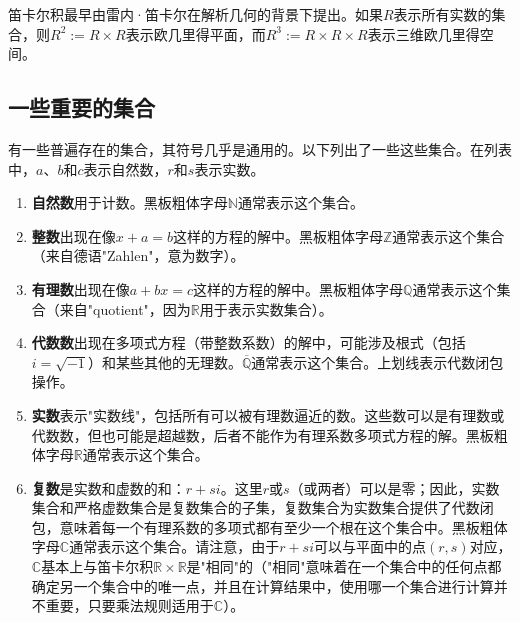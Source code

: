 笛卡尔积最早由雷内·笛卡尔在解析几何的背景下提出。如果$R$表示所有实数的集合，则$R^2 := R \times R$表示欧几里得平面，而$R^3 := R \times R \times R$表示三维欧几里得空间。
\subsection{一些重要的集合}  
有一些普遍存在的集合，其符号几乎是通用的。以下列出了一些这些集合。在列表中，$a$、$b$和$c$表示自然数，$r$和$s$表示实数。
\begin{enumerate}
\item \textbf{自然数}用于计数。黑板粗体字母$ \mathbb{N} $通常表示这个集合。
\item \textbf{整数}出现在像$x + a = b$这样的方程的解中。黑板粗体字母$ \mathbb{Z} $通常表示这个集合（来自德语"Zahlen"，意为数字）。
\item \textbf{有理数}出现在像$a + bx = c$这样的方程的解中。黑板粗体字母$ \mathbb{Q} $通常表示这个集合（来自"quotient"，因为$ \mathbb{R} $用于表示实数集合）。
\item \textbf{代数数}出现在多项式方程（带整数系数）的解中，可能涉及根式（包括$i = \sqrt{-1}$）和某些其他的无理数。$ \overline{\mathbb{Q}} $通常表示这个集合。上划线表示代数闭包操作。
\item \textbf{实数}表示"实数线"，包括所有可以被有理数逼近的数。这些数可以是有理数或代数数，但也可能是超越数，后者不能作为有理系数多项式方程的解。黑板粗体字母$ \mathbb{R} $通常表示这个集合。
\item \textbf{复数}是实数和虚数的和：$r + si$。这里$r$或$s$（或两者）可以是零；因此，实数集合和严格虚数集合是复数集合的子集，复数集合为实数集合提供了代数闭包，意味着每一个有理系数的多项式都有至少一个根在这个集合中。黑板粗体字母$ \mathbb{C} $通常表示这个集合。请注意，由于$ r + si $可以与平面中的点$(r, s)$对应，$ \mathbb{C} $基本上与笛卡尔积$ \mathbb{R} \times \mathbb{R} $是"相同"的（"相同"意味着在一个集合中的任何点都确定另一个集合中的唯一点，并且在计算结果中，使用哪一个集合进行计算并不重要，只要乘法规则适用于$ \mathbb{C} $）。
\end{enumerate}